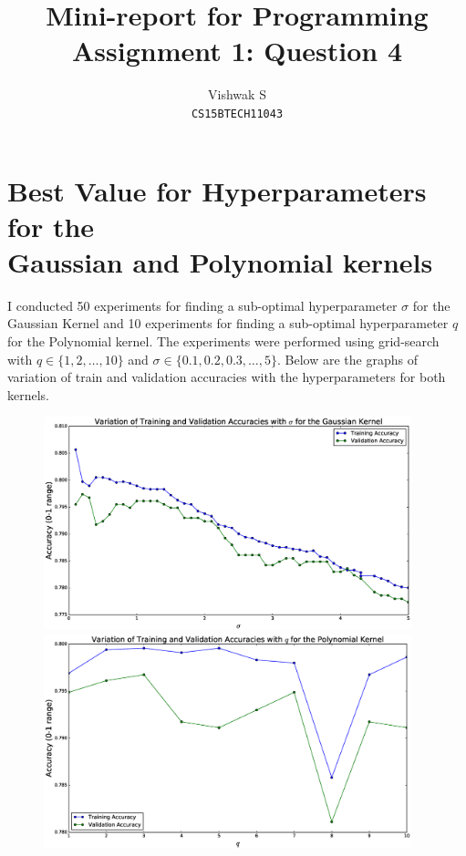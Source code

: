 \documentclass{article}
\title{Mini-report for Programming Assignment 1: Question 4}
\author{Vishwak S \\
\texttt{CS15BTECH11043}}
\date{}
\begin{document}
\maketitle
\section*{Best Value for Hyperparameters for the \\
Gaussian and Polynomial kernels}
\begin{flushleft}
I conducted 50 experiments for finding a sub-optimal hyperparameter \(\sigma\) for the Gaussian Kernel and 10 experiments for finding a sub-optimal hyperparameter \(q\) for the Polynomial kernel. The experiments were performed using grid-search with \(q \in \{1, 2, \ldots, 10\}\) and \(\sigma \in \{0.1, 0.2, 0.3, \ldots, 5\}\). Below are the graphs of variation of train and validation accuracies with the hyperparameters for both kernels.

\begin{figure}[H]
\begin{minipage}{0.45\linewidth}
\centering
\includegraphics[width=0.95\textwidth]{./images/gaussian.eps}
\end{minipage}
\hfill
\begin{minipage}{0.45\linewidth}
\centering
\includegraphics[width=0.95\textwidth]{./images/polynomial.eps}
\end{minipage}
\end{figure}


\end{flushleft}
\end{document}
